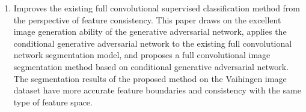 \begin{eabstract}
\begin{enumerate}[(1)]
  \item Improves the existing full convolutional supervised classification method from the perspective of feature consistency. This paper draws on the excellent image generation ability of the generative adversarial network, applies the conditional generative adversarial network to the existing full convolutional network segmentation model, and proposes a full convolutional image segmentation method based on conditional generative adversarial network. The segmentation results of the proposed method on the Vaihingen image dataset have more accurate feature boundaries and consistency with the same type of feature space.
  
\end{enumerate}

\end{eabstract}

